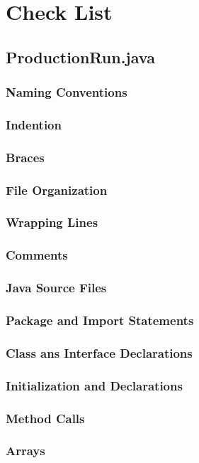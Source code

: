 \documentclass{article}
\begin{document}
\section{Check List}
 \subsection{ProductionRun.java}
  \subsubsection{Naming Conventions}
  \subsubsection{Indention}
  \subsubsection{Braces}
  \subsubsection{File Organization}
  \subsubsection{Wrapping Lines}
  \subsubsection{Comments}
  \subsubsection{Java Source Files}
  \subsubsection{Package and Import Statements}
  \subsubsection{Class ans Interface Declarations}
  \subsubsection{Initialization and Declarations}
  \subsubsection{Method Calls}
  \subsubsection{Arrays}
\end{document}

